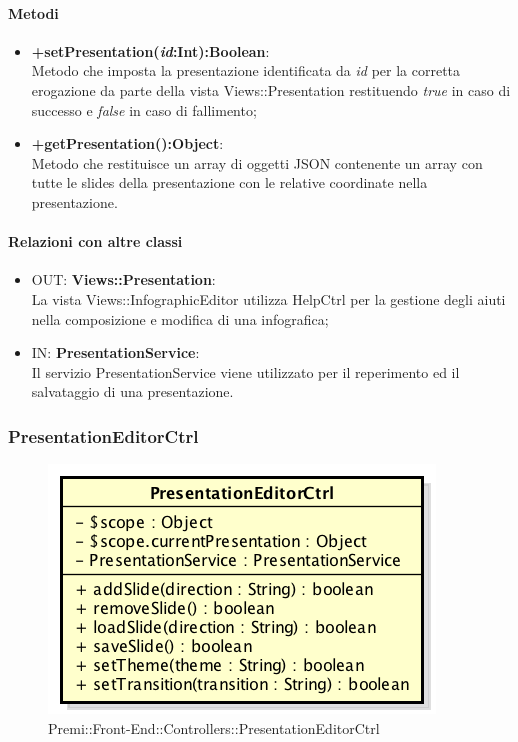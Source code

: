 	\paragraph{Metodi}
	\begin{itemize}
	  \item \textbf{+setPresentation(\textit{id}:Int):Boolean}:\\
		  Metodo che imposta la presentazione identificata da  \textit{id} per la corretta erogazione da parte della vista Views::Presentation restituendo \textit{true} in caso di successo e \textit{false} in caso di fallimento;
	  \item \textbf{+getPresentation():Object}:\\
		  Metodo che restituisce un array di oggetti JSON contenente un array con tutte le slides della presentazione con le relative coordinate nella presentazione.
		  
	\end{itemize}
	\paragraph{Relazioni con altre classi}
	\begin{itemize}
	  \item OUT: \textbf{Views::Presentation}:\\
		La vista Views::InfographicEditor utilizza HelpCtrl per la gestione degli aiuti nella composizione e modifica di una infografica;	
	  \item IN: \textbf{PresentationService}: \\
	  	Il servizio PresentationService viene utilizzato per il reperimento ed il salvataggio di una presentazione.
	\end{itemize}
	
\newpage	
\subsubsection{PresentationEditorCtrl}
\begin{figure}[h]
	\centering
	\includegraphics[width=0.5\linewidth]{img/premi_front_end_controllers_presentationeditorctrl}
	\caption[Premi::Front-End::Controllers::PresentationEditorCtrl]{Premi::Front-End::Controllers::PresentationEditorCtrl}
\end{figure}

